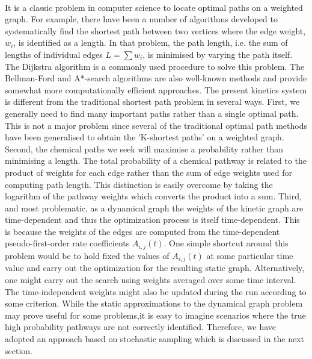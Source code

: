 \paragraph{}
It is a classic problem in computer science to locate optimal paths on a weighted
graph.\cite{ch1_IRPC_40_leiserson2001introduction} For example, there have been a number of algorithms developed to systematically
find the shortest path between two vertices where the edge weight, $w_i$, is identified
as a length. In that problem, the path length, i.e. the sum of lengths of individual
edges $L = \sum{w_i}$, is minimised by varying the path itself. The Dijkstra algorithm\cite{ch1_IRPC_41_dijkstra1959note} is a
commonly used procedure to solve this problem. The Bellman-Ford\cite{ch1_IRPC_42_bellman1958routing} and A*-search
algorithms\cite{ch1_IRPC_43_hart1968formal} are also well-known methods and provide somewhat more computationally
efficient approaches. The present kinetics system is different from the
traditional shortest path problem in several ways. First, we generally need to find many
important paths rather than a single optimal path. This is not a major problem since
several of the traditional optimal path methods have been generalised to obtain the
'K-shortest paths' on a weighted graph\cite{ch1_IRPC_44_eppstein1998finding}. Second, the chemical paths we seek will
maximise a probability rather than minimising a length. The total probability of a
chemical pathway is related to the product of weights for each edge rather than the
sum of edge weights used for computing path length. This distinction is easily overcome
by taking the logarithm of the pathway weights which converts the product into
a sum. Third, and most problematic, as a dynamical graph\cite{ch1_IRPC_45_harary1997dynamic} the weights of the
kinetic graph are time-dependent and thus the optimization process is itself time-dependent.
This is because the weights of the edges are computed from the time-dependent
pseudo-first-order rate coefficients $A_{i,j}(t)$. One simple shortcut around this problem
would be to hold fixed the values of $A_{i,j}(t)$ at some particular time value and carry out
the optimization for the resulting static graph. Alternatively, one might carry out the
search using weights averaged over some time interval. The time-independent weights
might also be updated during the run according to some criterion. While the static
approximations to the dynamical graph problem may prove useful for some problems,it is easy to imagine scenarios where the true high probability pathways are not
correctly identified. Therefore, we have adopted an approach based on stochastic sampling
which is discussed in the next section.
